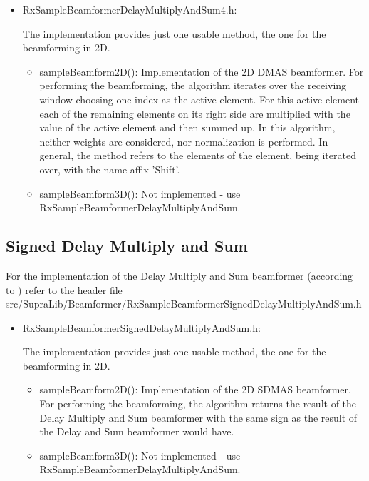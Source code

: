 \documentclass[12pt,a4paper,oneside]{scrartcl}
\begin{document}
\begin{itemize}
  \item RxSampleBeamformerDelayMultiplyAndSum4.h:

    The implementation provides just one usable method, the one for the beamforming in 2D.
      \begin{itemize}
        \item sampleBeamform2D():
          Implementation of the 2D DMAS beamformer.
          For performing the beamforming, the algorithm iterates over the receiving window choosing one index as the active element.
          For this active element each of the remaining elements on its right side are multiplied with the value of the active element and then summed up.
          In this algorithm, neither weights are considered, nor normalization is performed.
          In general, the method refers to the elements of the element, being iterated over, with the name affix 'Shift'.
        \item sampleBeamform3D():
          Not implemented - use RxSampleBeamformerDelayMultiplyAndSum.
      \end{itemize}
\end{itemize}

\subsection{Signed Delay Multiply and Sum}
For the implementation of the Delay Multiply and Sum beamformer (according to \cite{articleAboutSDMAS}) refer to the header file src/SupraLib/Beamformer/RxSampleBeamformerSignedDelayMultiplyAndSum.h

\begin{itemize}
  \item RxSampleBeamformerSignedDelayMultiplyAndSum.h:

    The implementation provides just one usable method, the one for the beamforming in 2D.
      \begin{itemize}
        \item sampleBeamform2D():
          Implementation of the 2D SDMAS beamformer.
          For performing the beamforming, the algorithm returns the result of the Delay Multiply and Sum beamformer with the same sign as the result of the Delay and Sum beamformer would have.
        \item sampleBeamform3D():
          Not implemented - use RxSampleBeamformerDelayMultiplyAndSum.
      \end{itemize}

\end{itemize}


\end{document}
